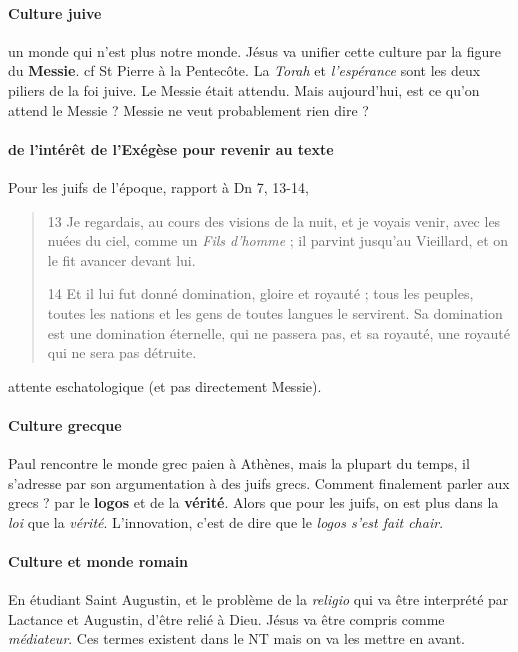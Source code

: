\paragraph{Culture juive} un monde qui n'est plus notre monde. Jésus va unifier cette culture par la figure du \textbf{Messie}. cf St Pierre à la Pentecôte. La \textit{Torah} et \textit{l'espérance} sont les deux piliers de la foi juive. Le Messie était attendu. Mais aujourd'hui, est ce qu'on attend le Messie ? Messie ne veut probablement rien dire ? 

\paragraph{de l'intérêt de l'Exégèse pour revenir au texte}
\begin{Ex}
Pour les juifs de l'époque, rapport à Dn 7, 13-14, 
\begin{quote}
    13 Je regardais, au cours des visions de la nuit, et je voyais venir, avec les nuées du ciel, comme un \textit{Fils d’homme} ; il parvint jusqu’au Vieillard, et on le fit avancer devant lui.

14 Et il lui fut donné domination, gloire et royauté ; tous les peuples, toutes les nations et les gens de toutes langues le servirent. Sa domination est une domination éternelle, qui ne passera pas, et sa royauté, une royauté qui ne sera pas détruite.
\end{quote}
attente eschatologique (et pas directement Messie).  
\end{Ex}

\paragraph{Culture grecque} Paul rencontre le monde grec paien à Athènes, mais la plupart du temps, il s'adresse par son argumentation à des juifs grecs. 
Comment finalement parler aux grecs ? par le \textbf{logos} et de la \textbf{vérité}. Alors que pour les juifs, on est plus dans la \textit{loi} que la \textit{vérité}. L'innovation, c'est de dire que le \textit{logos s'est fait chair}.

\paragraph{Culture et monde romain} En étudiant Saint Augustin, et le problème de la \textit{religio} qui va être interprété par Lactance et Augustin, d'être relié à Dieu. Jésus va être compris comme \textit{médiateur}. Ces termes existent dans le NT mais on va les mettre en avant. 

